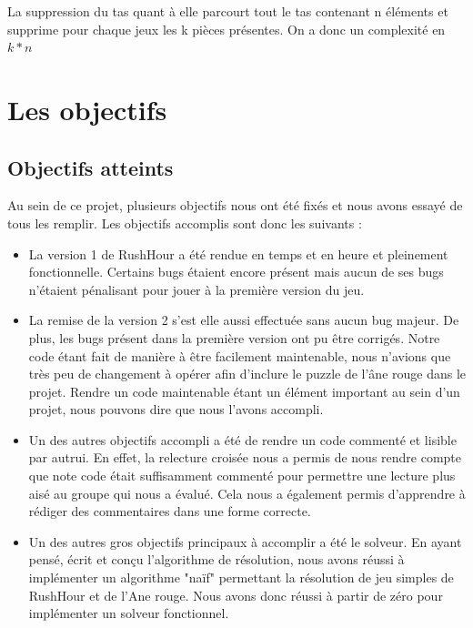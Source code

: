 \documentclass{article}
\begin{document}
La suppression du tas quant à elle parcourt tout le tas contenant n éléments et supprime pour chaque jeux les k pièces présentes. On a donc un complexité en $k * n$


\section {Les objectifs}
\subsection {Objectifs atteints}
Au sein de ce projet, plusieurs objectifs nous ont été fixés et nous avons essayé de tous les remplir.
Les objectifs accomplis sont donc les suivants : \\
\begin{itemize}
\item La version 1 de RushHour a été rendue en temps et en heure et pleinement fonctionnelle. Certains bugs étaient encore présent mais aucun de ses bugs n'étaient pénalisant pour jouer à la première version du jeu.\\

\item La remise de la version 2 s'est elle aussi effectuée sans aucun bug majeur. De plus, les bugs présent dans la première version ont pu être corrigés. Notre code étant fait de manière à être facilement maintenable, nous n'avions que très peu de changement à opérer afin d'inclure le puzzle de l'âne rouge dans le projet. Rendre un code maintenable étant un élément important au sein d'un projet, nous pouvons dire que nous l'avons accompli.\\

\item Un des autres objectifs accompli a été de rendre un code commenté et lisible par autrui. En effet, la relecture croisée nous a permis de nous rendre compte que note code était suffisamment commenté pour permettre une lecture plus aisé au groupe qui nous a évalué. Cela nous a également permis d'apprendre à rédiger des commentaires dans une forme correcte.\\

\item  Un des autres gros objectifs principaux à accomplir a été le solveur. En ayant pensé, écrit et conçu l'algorithme de résolution, nous avons réussi à implémenter un algorithme "naïf" permettant la résolution de jeu simples de RushHour et de l'Ane rouge. Nous avons donc réussi à partir de zéro pour implémenter un solveur fonctionnel.\\


\end{itemize}
\end{document}

